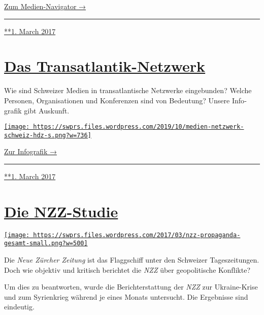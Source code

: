 \href{https://swprs.org/medien-navigator/}{Zum Medien-Navigator →}

\begin{center}\rule{0.5\linewidth}{\linethickness}\end{center}

\href{https://swprs.org/2017/03/01/der-medien-navigator/}{**1. March
2017}

\hypertarget{das-transatlantik-netzwerk}{%
\section{\texorpdfstring{\href{https://swprs.org/2017/03/01/das-netzwerk/}{Das
Transatlantik-Netzwerk}}{Das Transatlantik-Netzwerk}}\label{das-transatlantik-netzwerk}}

Wie sind Schweizer Medien in trans­at­lantische Netz­werke
ein­ge­bunden? Welche Personen, Organi­sa­tionen und Kon­fe­ren­zen sind
von Bedeutung? Unsere Info­grafik gibt Auskunft.

\href{https://swprs.org/netzwerk-medien-schweiz}{\texttt{[image: https://swprs.files.wordpress.com/2019/10/medien-netzwerk-schweiz-hdz-s.png?w=736]}}

\href{https://swprs.org/netzwerk-medien-schweiz}{Zur Infografik →}

\begin{center}\rule{0.5\linewidth}{\linethickness}\end{center}

\href{https://swprs.org/2017/03/01/das-netzwerk/}{**1. March 2017}

\hypertarget{die-nzz-studie}{%
\section{\texorpdfstring{\href{https://swprs.org/2017/03/01/die-nzz-studie/}{Die
NZZ-Studie}}{Die NZZ-Studie}}\label{die-nzz-studie}}

\href{https://swprs.org/2017/03/01/die-nzz-studie/}{\texttt{[image: https://swprs.files.wordpress.com/2017/03/nzz-propaganda-gesamt-small.png?w=500]}}

Die \emph{Neue Zürcher Zeitung} ist das Flagg­schiff unter den Schweizer
Tages­zei­tungen. Doch wie objektiv und kritisch berichtet die
\emph{NZZ} über geo­politische Konf‌likte?

Um dies zu be­ant­worten, wurde die Bericht­erstattung der \emph{NZZ}
zur Ukraine-Krise und zum Syrien­krieg während je eines Monats
unter­sucht. Die Ergebnisse sind eindeutig.

